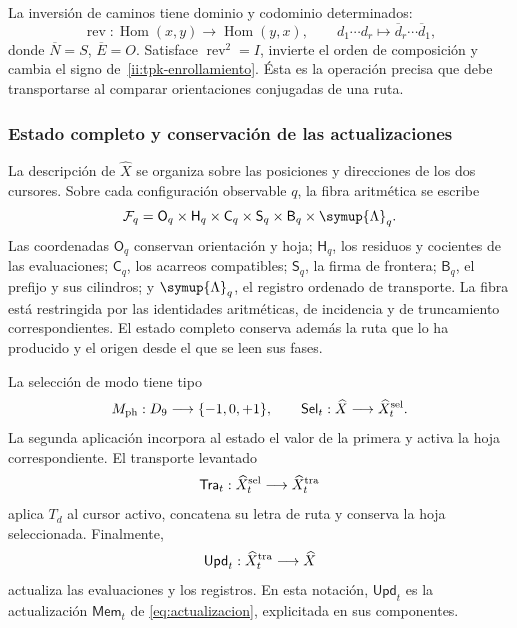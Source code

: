 La inversión de caminos tiene dominio y codominio determinados:
\[
 \operatorname{rev}:\operatorname{Hom}(x,y)
 \longrightarrow\operatorname{Hom}(y,x),\qquad
 d_1\cdots d_r\longmapsto\overline d_r\cdots\overline d_1,
\]
donde \(\overline N=S\), \(\overline E=O\). Satisface
\(\operatorname{rev}^2=I\), invierte el orden de composición y cambia el
signo de~\eqref{ii:tpk-enrollamiento}. Ésta es la operación precisa que
debe transportarse al comparar orientaciones conjugadas de una ruta.

\subsubsection{Estado completo y conservación de las actualizaciones}

La descripción de \(\widehat X\) se organiza sobre las posiciones y
direcciones de los dos cursores. Sobre cada configuración observable
\(q\), la fibra aritmética se escribe
\begin{equation}
 \mathcal F_q=
 \mathsf O_q\times\mathsf H_q\times\mathsf C_q\times
 \mathsf S_q\times\mathsf B_q\times\symup{\Lambda}_q.
 \label{ii:tpk-fibra}
\end{equation}
Las coordenadas \(\mathsf O_q\) conservan orientación y hoja;
\(\mathsf H_q\), los residuos y cocientes de las evaluaciones;
\(\mathsf C_q\), los acarreos compatibles;
\(\mathsf S_q\), la firma de frontera;
\(\mathsf B_q\), el prefijo y sus cilindros; y
\(\symup{\Lambda}_q\), el registro ordenado de transporte. La fibra está
restringida por las identidades aritméticas, de incidencia y de
truncamiento correspondientes. El estado completo conserva además la ruta
que lo ha producido y el origen desde el que se leen sus fases.

La selección de modo tiene tipo
\[
 M_{\rm ph}:D_9\longrightarrow\{-1,0,+1\},\qquad
 \mathsf{Sel}_t:\widehat X\longrightarrow\widehat X^{\rm sel}_t.
\]
La segunda aplicación incorpora al estado el valor de la primera y
activa la hoja correspondiente. El transporte levantado
\[
 \mathsf{Tra}_t:\widehat X^{\rm sel}_t
 \longrightarrow\widehat X^{\rm tra}_t
\]
aplica \(T_d\) al cursor activo, concatena su letra de ruta y conserva la
hoja seleccionada. Finalmente,
\[
 \mathsf{Upd}_t:\widehat X^{\rm tra}_t\longrightarrow\widehat X
\]
actualiza las evaluaciones y los registros. En esta notación,
\(\mathsf{Upd}_t\) es la actualización \(\mathsf{Mem}_t\) de
\eqref{eq:actualizacion}, explicitada en sus componentes.

